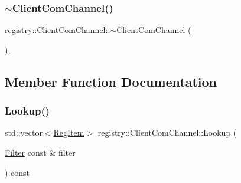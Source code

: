 \subsubsection{\texorpdfstring{$\sim$\+Client\+Com\+Channel()}{~ClientComChannel()}}
{\footnotesize\ttfamily registry\+::\+Client\+Com\+Channel\+::$\sim$\+Client\+Com\+Channel (\begin{DoxyParamCaption}{ }\end{DoxyParamCaption})\hspace{0.3cm}{\ttfamily [default]}, {\ttfamily [noexcept]}}



\subsection{Member Function Documentation}
\mbox{\label{classregistry_1_1ClientComChannel_a564ba5480214a74c5697120084cafb54}} 
\subsubsection{\texorpdfstring{Lookup()}{Lookup()}}
{\footnotesize\ttfamily std\+::vector$<$\hyperlink{classregistry_1_1RegItem}{Reg\+Item}$>$ registry\+::\+Client\+Com\+Channel\+::\+Lookup (\begin{DoxyParamCaption}\item[{\hyperlink{classregistry_1_1Filter}{Filter} const \&}]{filter }\end{DoxyParamCaption}) const\hspace{0.3cm}{\ttfamily [inline]}}


